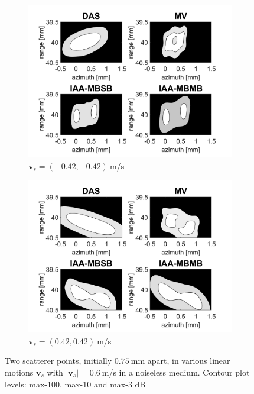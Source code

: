 \begin{figure}[ht]
\begin{subfigure}[t]{0.48\linewidth}
        \includegraphics[width=\linewidth]{./images/results/2.2/motion_45_-06.png}
        \caption{$\boldsymbol{v}_s = (-0.42, -0.42)~$m/s}
    \end{subfigure}
    \quad
    \begin{subfigure}[t]{0.48\linewidth}
        \includegraphics[width=\linewidth]{./images/results/2.2/motion_45_06.png}
        \caption{$\boldsymbol{v}_s = (0.42, 0.42)~$m/s}
    \end{subfigure}
	\caption{Two scatterer points, initially $0.75~$mm apart, in various linear motions $\boldsymbol{v}_s$ with $|\boldsymbol{v}_s|=0.6~$m/s in a noiseless medium. Contour plot levels: max-100, max-10 and max-3 dB}
	\label{fig:linear_motion_double}
\end{figure}
